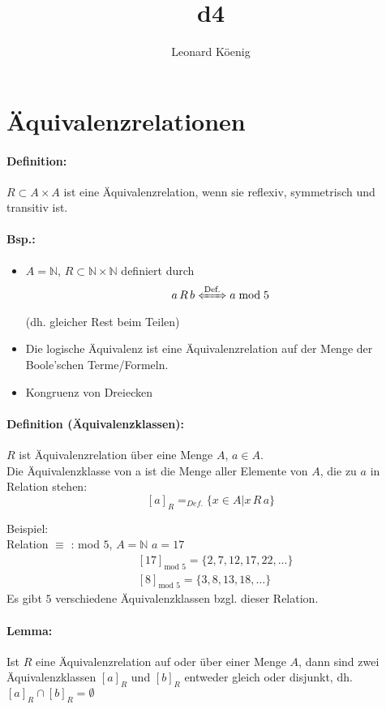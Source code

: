 \documentclass[10pt,a4paper]{article}
\author{Leonard K\"oenig}
\title{d4}
\begin{document}
\section{Äquivalenzrelationen}
\paragraph{Definition:} $R\subset A\times A$ ist eine Äquivalenzrelation, wenn sie reflexiv, symmetrisch und transitiv ist.

\paragraph{Bsp.:}
\begin{itemize}
\item $A=\mathbb{N}$, $R\subset\mathbb{N}\times\mathbb{N}$ definiert durch
\[
a\,R\,b \xLeftrightarrow{\text{Def.}} a\bmod 5
\]
(dh. gleicher Rest beim Teilen)
\item Die logische Äquivalenz ist eine Äquivalenzrelation auf der Menge der Boole'schen Terme/Formeln.
\item Kongruenz von Dreiecken
\end{itemize}

\paragraph{Definition (Äquivalenzklassen):}$R$ ist \"Aquivalenzrelation \"uber eine Menge $A$, $a\in A$.\\
Die \"Aquivalenzklasse von a ist die Menge aller Elemente von $A$, die zu $a$ in Relation stehen:
\[
[a]_{R} =_{Def.} \{x \in A | x\,R\,a\}
\]

Beispiel:\\
Relation $\equiv$ : mod $5$, $A = \mathbb{N}$ $a=17$
\begin{align*}
&[17]_{\text{mod }5} = \{2,7,12,17,22,...\} \\
&[8]_{\text{mod }5} = \{3,8,13,18, \ldots\}
\end{align*}
Es gibt $5$ verschiedene \"Aquivalenzklassen bzgl. dieser Relation.

\paragraph{Lemma: } Ist $R$ eine \"Aquivalenzrelation auf oder \"uber einer Menge $A$, dann sind zwei \"Aquivalenzklassen $[a]_R$ und $[b]_R$ entweder gleich oder disjunkt, dh. $[a]_R \cap [b]_R = \emptyset$
\end{document}
